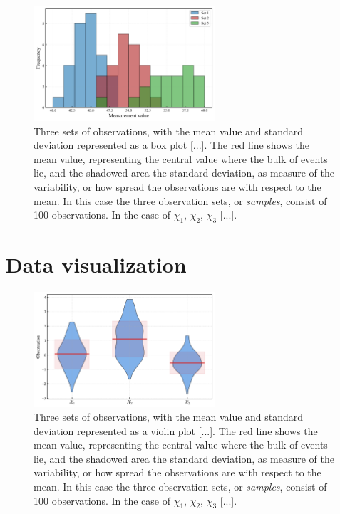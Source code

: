 \documentclass{book}
\begin{document}
\begin{figure}[ht]
    \centering
    \includegraphics[width=0.6\textwidth]{figures/chapter1/measurements_histogram.png}
    \caption{Three sets of observations, with the mean value and standard deviation represented as a box plot [...]. The red line shows the mean value, representing the central value where the bulk of events lie, and the shadowed area the standard deviation, as measure of the variability, or how spread the observations are with respect to the mean. In this case the three observation sets, or \textit{samples}, consist of 100 observations. In the case of $\chi_1$, $\chi_2$, $\chi_3$ [...].}
    \label{fig:histogram1}
\end{figure}

\section{Data visualization}

\begin{figure}[ht]
    \centering
    \includegraphics[width=0.6\textwidth]{figures/chapter1/mean_std_violin.png}
    \caption{Three sets of observations, with the mean value and standard deviation represented as a violin plot [...]. The red line shows the mean value, representing the central value where the bulk of events lie, and the shadowed area the standard deviation, as measure of the variability, or how spread the observations are with respect to the mean. In this case the three observation sets, or \textit{samples}, consist of 100 observations. In the case of $\chi_1$, $\chi_2$, $\chi_3$ [...].}
    \label{fig:histogram1}
\end{figure}
\end{document}
